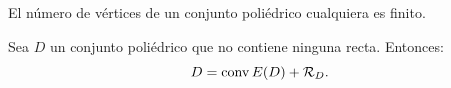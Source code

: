 \begin{corollary}\label{v1:cor:3.2.4}
 El número de vértices de un conjunto poliédrico cualquiera es finito.
\end{corollary}

\begin{theorem}\label{v1:thm:3.2.8}
 Sea $D$ un conjunto poliédrico que no contiene ninguna recta. Entonces:
 \[
 D = \operatorname{conv} E(D) + \mathcal{R}_D.
 \]
\end{theorem}
